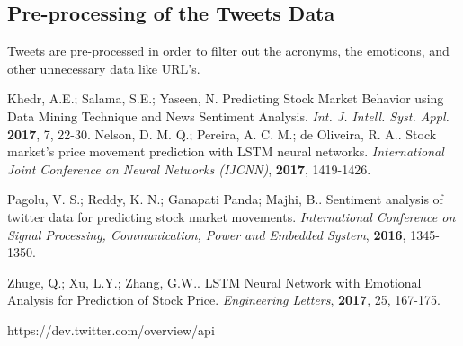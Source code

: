 \documentclass[conference]{IEEEtran}
\begin{document}
\subsection{Pre-processing of the Tweets Data}
\par Tweets are pre-processed in order to filter out the acronyms, the emoticons, and other unnecessary data like URL's. 
\begin{thebibliography}{2}
 Khedr, A.E.; Salama, S.E.; Yaseen, N. Predicting Stock Market Behavior using Data Mining Technique and News Sentiment Analysis. \textit{Int. J. Intell. Syst. Appl.} \textbf{2017}, 7, 22-30.
 Nelson, D. M. Q.; Pereira, A. C. M.; de Oliveira, R. A.. Stock market’s price movement
prediction with LSTM neural networks. \textit{International Joint Conference on Neural Networks (IJCNN)}, \textbf{2017}, 1419-1426.

 Pagolu, V. S.; Reddy, K. N.; Ganapati Panda; Majhi, B.. Sentiment
analysis of twitter data for predicting stock market
movements. \textit{International
Conference on Signal Processing, Communication,
Power and Embedded System}, \textbf{2016}, 1345-1350.

 Zhuge, Q.; Xu, L.Y.; Zhang, G.W..  LSTM Neural Network with Emotional
Analysis for Prediction of Stock Price. \textit{Engineering Letters}, \textbf{2017}, 25, 167-175.

 https://dev.twitter.com/overview/api
\end{thebibliography}
\end{document}
